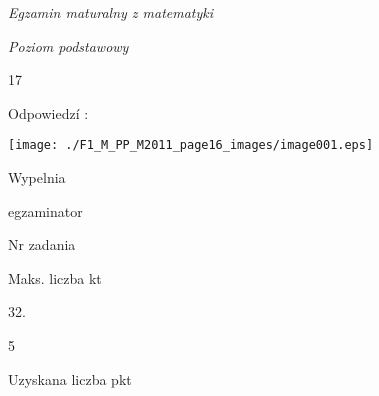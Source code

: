 \documentclass[a4paper,12pt]{article}
\begin{document}
{\it Egzamin maturalny z matematyki}

{\it Poziom podstawowy}

17

Odpowiedzí :
\begin{center}
\texttt{[image: ./F1\_M\_PP\_M2011\_page16\_images/image001.eps]}
\end{center}
Wypelnia

egzaminator

Nr zadania

Maks. liczba kt

32.

5

Uzyskana liczba pkt
\end{document}
